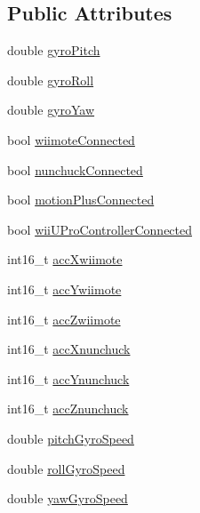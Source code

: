 \subsection*{\-Public \-Attributes}
\begin{DoxyCompactItemize}
\item 
double \hyperlink{class_w_i_i_af61f57d34b81f2a878f0126a074e3af4}{gyro\-Pitch}
\item 
double \hyperlink{class_w_i_i_a2a0e4745bff7cfec644bcebe984c2bc8}{gyro\-Roll}
\item 
double \hyperlink{class_w_i_i_a988db5b35cfc3c543f93f49587a50e62}{gyro\-Yaw}
\end{DoxyCompactItemize}
{\bf }\par
\begin{DoxyCompactItemize}
\item 
bool \hyperlink{class_w_i_i_ae25a8ea1b0713801e0209e795b4596fa}{wiimote\-Connected}
\item 
bool \hyperlink{class_w_i_i_a7cb4cec343c65fd350e6b05043d7f1a8}{nunchuck\-Connected}
\item 
bool \hyperlink{class_w_i_i_a72bd4fad2e524276712a154b8cc2a16c}{motion\-Plus\-Connected}
\item 
bool \hyperlink{class_w_i_i_a461f5b7a5f2bc874e107fc776c284b16}{wii\-U\-Pro\-Controller\-Connected}
\end{DoxyCompactItemize}

{\bf }\par
\begin{DoxyCompactItemize}
\item 
int16\-\_\-t \hyperlink{class_w_i_i_afaafee11ac191ba43b6a2b989cdd137c}{acc\-Xwiimote}
\item 
int16\-\_\-t \hyperlink{class_w_i_i_aa2c14275d9e482e6add06cb34ccf1197}{acc\-Ywiimote}
\item 
int16\-\_\-t \hyperlink{class_w_i_i_acdebdaab544ffcecf8ab09adacbd28c8}{acc\-Zwiimote}
\item 
int16\-\_\-t \hyperlink{class_w_i_i_a3a13b5931284d5bcd6647f681cda95b4}{acc\-Xnunchuck}
\item 
int16\-\_\-t \hyperlink{class_w_i_i_ae657585a560e9d214e6c0219f8b47aeb}{acc\-Ynunchuck}
\item 
int16\-\_\-t \hyperlink{class_w_i_i_a42af5743d2e3c2dbc01ea0b5531cc7c6}{acc\-Znunchuck}
\end{DoxyCompactItemize}

{\bf }\par
\begin{DoxyCompactItemize}
\item 
double \hyperlink{class_w_i_i_acfb290a86aa9a65dd4ae84d02e3c6ded}{pitch\-Gyro\-Speed}
\item 
double \hyperlink{class_w_i_i_a3fb552c6ad486e23434dcb347a2a4b84}{roll\-Gyro\-Speed}
\item 
double \hyperlink{class_w_i_i_ad5df436cc5d073f26bf3ea5c60d788d6}{yaw\-Gyro\-Speed}
\end{DoxyCompactItemize}

